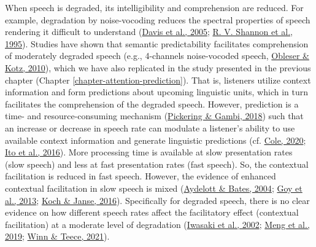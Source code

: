 \documentclass[a4paper, nobind]{templates/ociamthesis}
\begin{document}
When speech is degraded, its intelligibility and comprehension are reduced.
For example, degradation by noise-vocoding reduces the spectral properties of speech rendering it difficult to understand (\protect\hyperlink{ref-Davis2005}{Davis et al., 2005}; \protect\hyperlink{ref-Shannon1995}{R. V. Shannon et al., 1995}).
Studies have shown that semantic predictability facilitates comprehension of moderately degraded speech (e.g., 4-channels noise-vocoded speech, \protect\hyperlink{ref-Obleser2010}{Obleser \& Kotz, 2010}),
which we have also replicated in the study presented in the previous chapter (Chapter \ref{chapter-attention-prediction}).
That is, listeners utilize context information and form predictions about upcoming linguistic units,
which in turn facilitates the comprehension of the degraded speech.
However, prediction is a time- and resource-consuming mechanism (\protect\hyperlink{ref-Pickering2018}{Pickering \& Gambi, 2018}) such that an increase or decrease in speech rate can modulate a listener's ability to use available context information and generate linguistic predictions (cf. \protect\hyperlink{ref-Cole2020}{Cole, 2020}; \protect\hyperlink{ref-Ito2016}{Ito et al., 2016}).
More processing time is available at slow presentation rates (slow speech) and less at fast presentation rates (fast speech).
So, the contextual facilitation is reduced in fast speech.
However, the evidence of enhanced contextual facilitation in slow speech is mixed (\protect\hyperlink{ref-Aydelott2004}{Aydelott \& Bates, 2004}; \protect\hyperlink{ref-Goy2013}{Goy et al., 2013}; \protect\hyperlink{ref-Koch2016}{Koch \& Janse, 2016}).
Specifically for degraded speech, there is no clear evidence on how different speech rates affect the facilitatory effect (contextual facilitation) at a moderate level of degradation (\protect\hyperlink{ref-Iwasaki2002}{Iwasaki et al., 2002}; \protect\hyperlink{ref-Meng2019}{Meng et al., 2019}; \protect\hyperlink{ref-Winn2021}{Winn \& Teece, 2021}).
\end{document}
